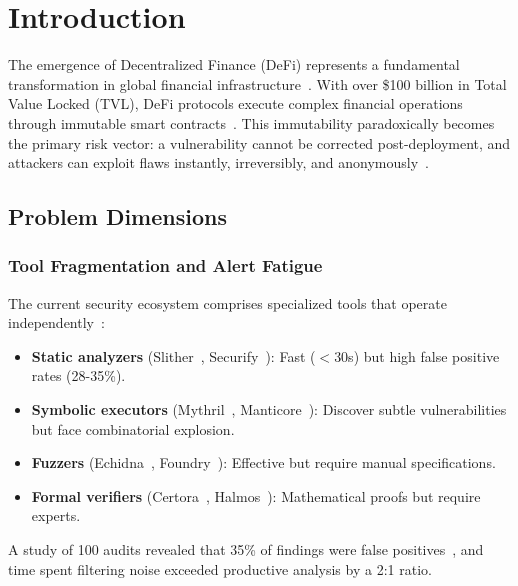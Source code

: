 \documentclass[11pt]{article}
\theoremstyle{definition}
\theoremstyle{plain}
\theoremstyle{remark}
\begin{document}
\section{Introduction}
\label{sec:intro}

The emergence of Decentralized Finance (DeFi) represents a fundamental transformation in global financial infrastructure~\cite{werner2022sok}. With over \$100 billion in Total Value Locked (TVL), DeFi protocols execute complex financial operations through immutable smart contracts~\cite{gudgeon2020defi}. This immutability paradoxically becomes the primary risk vector: a vulnerability cannot be corrected post-deployment, and attackers can exploit flaws instantly, irreversibly, and anonymously~\cite{perez2021smart}.

\subsection{Problem Dimensions}

\subsubsection{Tool Fragmentation and Alert Fatigue}

The current security ecosystem comprises specialized tools that operate independently~\cite{durieux2020empirical}:

\begin{itemize}[leftmargin=*]
    \item \textbf{Static analyzers} (Slither~\cite{feist2019slither}, Securify~\cite{tsankov2018securify}): Fast ($<$30s) but high false positive rates (28-35\%).
    
    \item \textbf{Symbolic executors} (Mythril~\cite{mueller2018mythril}, Manticore~\cite{mossberg2019manticore}): Discover subtle vulnerabilities but face combinatorial explosion.
    
    \item \textbf{Fuzzers} (Echidna~\cite{grieco2020echidna}, Foundry~\cite{foundry2023}): Effective but require manual specifications.
    
    \item \textbf{Formal verifiers} (Certora~\cite{certora2023}, Halmos~\cite{halmos2023}): Mathematical proofs but require experts.
\end{itemize}

A study of 100 audits revealed that 35\% of findings were false positives~\cite{durieux2020empirical}, and time spent filtering noise exceeded productive analysis by a 2:1 ratio.
\end{document}
